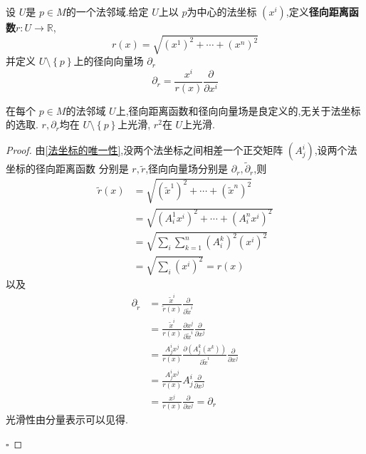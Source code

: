 \documentclass[../../几何与拓扑.tex]{subfiles}
\begin{document}
\begin{definition}
    设 \(  U  \)是 \(  p \in M  \)的一个法邻域.给定 \(  U  \)上以 \(  p  \)为中心的法坐标 \(  \left( x^{i} \right)   \),定义\textbf{径向距离函数}\(  r:U\to \mathbb{R}   \), \[
    r\left( x \right)= \sqrt{\left( x^{1} \right)^{2}+ \cdots + \left( x^{n} \right)^{2}  } 
    \]    并定义 \(  U\setminus \left\{ p \right\}  \)上的径向向量场 \(  \partial _{r}  \) \[
    \partial _{r} =  \frac{x^{i} }{r\left( x \right)  } \frac{\partial }{\partial x^{i}}
    \]    
\end{definition}

\begin{lemma}
    在每个 \(  p \in M  \)的法邻域 \(  U  \)上,径向距离函数和径向向量场是良定义的,无关于法坐标的选取.
     \(  r,\partial _{r}  \)均在 \(  U\setminus \left\{ p \right\}  \)上光滑, \(  r^{2}  \)在 \(  U  \)上光滑.      
\end{lemma}

\begin{proof}
    由\ref{法坐标的唯一性},没两个法坐标之间相差一个正交矩阵 \(  \left( A_{j}^{i} \right)   \),设两个法坐标的径向距离函数
    分别是 \(  r,\tilde{r}  \),径向向量场分别是 \(  \partial _{r},\tilde{\partial} _{r}  \),则 \[
    \begin{aligned}
        \tilde{r}\left( x \right)& = \sqrt{\left( \tilde{x}^{1} \right)^{2}+ \cdots + \left( \tilde{x}^{n} \right)^{2}  }  \\ 
         & = \sqrt{\left( A_{i}^{1}x^{i} \right)^{2}+ \cdots + \left( A_{i}^{n} x^{i}\right)^{2}  }\\ 
          & = \sqrt{\sum _{i}\sum _{k= 1}^{n}\left( A_{i}^{k} \right)^{2}\left( x^{i} \right)^{2}   }\\ 
           & =  \sqrt{\sum _{i} \left( x^{i} \right)^{2} }= r\left( x \right) 
    \end{aligned}
    \]   以及 \[
   \begin{aligned}
    \partial _{\tilde{r}}& = \frac{\tilde{x}^{i} }{\tilde{r}\left( x \right)  } \frac{\partial }{\partial \tilde{x}^{i}}\\ 
     & =   \frac{\tilde{x}^{i} }{r\left( x \right)  } \frac{\partial {x}^{j}}{\partial \tilde{x}^{i}} \frac{\partial }{\partial x^{j}} \\ 
      & =  \frac{A_{j}^{i}x^{j} }{{r}\left( x \right)  } \frac{\partial \left( A_{j}^{k}\left( x^{k} \right)  \right) }{\partial \tilde{x}^{i}} \frac{\partial }{\partial x^{j}}\\ 
       & = \frac{A_{j}^{i}x^{j} }{{r}\left( x \right)  } A_{j}^{i} \frac{\partial }{\partial x^{j}}  \\ 
        & = \frac{x^{j} }{r\left( x \right)  }\frac{\partial }{\partial x^{j}}= \partial _{r} 
   \end{aligned}
    \]光滑性由分量表示可以见得.

    \hfill $\square$
\end{proof}
\end{document}
